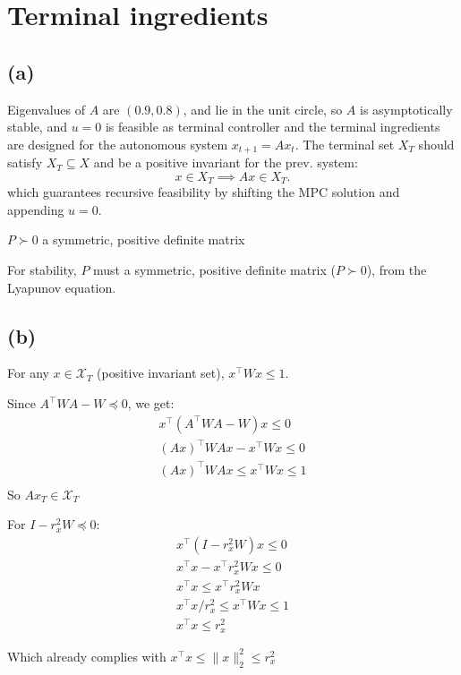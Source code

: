 \section{Terminal ingredients}

\subsection*{(a)}
Eigenvalues of $A$ are $(0.9,0.8)$, and lie in the unit circle, so $A$ is asymptotically stable, and \(u=0\) is feasible as terminal controller and the terminal
ingredients are designed for the autonomous system $x_{t+1}=Ax_t$.
The terminal set \(X_T\) should satisfy \(X_T \subseteq X\) and be a positive invariant for the prev. system:
\[
x\in X_T \implies Ax\in X_T.
\]
which guarantees recursive feasibility by shifting the MPC solution and appending \(u=0\).

$P \succ 0$ a symmetric, positive definite matrix

For stability, $P$ must a symmetric, positive definite matrix ($P \succ 0$), from the Lyapunov equation.

\subsection*{(b)}
For any $x \in \mathcal{X}_{T}$ (positive invariant set), $x^\top Wx \leq 1$.

Since $A^{\top}WA - W \preceq 0$, we get:
\begin{align*}
x^{\top}(A^{\top}WA - W)x \leq 0 \\
(Ax)^{\top}WAx - x^{\top}Wx \leq 0 \\
(Ax)^{\top}WAx \leq x^{\top}Wx \leq 1 \\
\end{align*}
So $Ax_T \in \mathcal{X}_T$

For $I - r^2_xW \preceq 0$:
\begin{align*}
x^{\top}(I - r^2_xW)x \leq 0 \\
x^{\top}x - x^{\top}r^2_xWx \leq 0 \\
x^{\top}x \leq x^{\top}r^2_xWx \\
x^{\top}x/r^2_x \leq x^{\top}Wx \leq 1 \\
x^{\top}x \leq r^2_x
\end{align*}

Which already complies with $x^{\top}x \leq \| x \|^2_2 \leq r^2_x$

